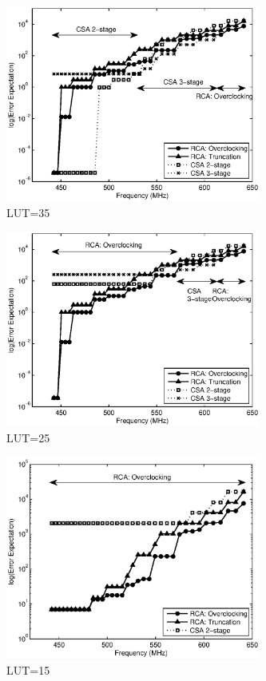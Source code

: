 \documentclass[journal]{IEEEtran}
\begin{document}
\begin{figure}[htbp]
	\centering
	\includegraphics[width=3.3in]{./Figures/Error_LUT35.eps}
	\caption{LUT=35}
\end{figure}

\begin{figure}[htbp]
	\centering
	\includegraphics[width=3.3in]{./Figures/Error_LUT25.eps}
	\caption{LUT=25}
\end{figure}

\begin{figure}[htbp]
	\centering
	\includegraphics[width=3.3in]{./Figures/Error_LUT15.eps}
	\caption{LUT=15}
\end{figure}
\end{document}
